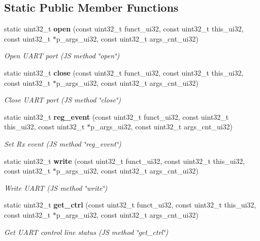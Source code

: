 \subsection*{Static Public Member Functions}
\begin{DoxyCompactItemize}
\item 
static uint32\+\_\+t \textbf{ open} (const uint32\+\_\+t funct\+\_\+ui32, const uint32\+\_\+t this\+\_\+ui32, const uint32\+\_\+t $\ast$p\+\_\+args\+\_\+ui32, const uint32\+\_\+t args\+\_\+cnt\+\_\+ui32)
\begin{DoxyCompactList}\small\item\em Open U\+A\+RT port (JS method \char`\"{}open\char`\"{}) \end{DoxyCompactList}\item 
static uint32\+\_\+t \textbf{ close} (const uint32\+\_\+t funct\+\_\+ui32, const uint32\+\_\+t this\+\_\+ui32, const uint32\+\_\+t $\ast$p\+\_\+args\+\_\+ui32, const uint32\+\_\+t args\+\_\+cnt\+\_\+ui32)
\begin{DoxyCompactList}\small\item\em Close U\+A\+RT port (JS method \char`\"{}close\char`\"{}) \end{DoxyCompactList}\item 
static uint32\+\_\+t \textbf{ reg\+\_\+event} (const uint32\+\_\+t funct\+\_\+ui32, const uint32\+\_\+t this\+\_\+ui32, const uint32\+\_\+t $\ast$p\+\_\+args\+\_\+ui32, const uint32\+\_\+t args\+\_\+cnt\+\_\+ui32)
\begin{DoxyCompactList}\small\item\em Set Rx event (JS method \char`\"{}reg\+\_\+event\char`\"{}) \end{DoxyCompactList}\item 
static uint32\+\_\+t \textbf{ write} (const uint32\+\_\+t funct\+\_\+ui32, const uint32\+\_\+t this\+\_\+ui32, const uint32\+\_\+t $\ast$p\+\_\+args\+\_\+ui32, const uint32\+\_\+t args\+\_\+cnt\+\_\+ui32)
\begin{DoxyCompactList}\small\item\em Write U\+A\+RT (JS method \char`\"{}write\char`\"{}) \end{DoxyCompactList}\item 
static uint32\+\_\+t \textbf{ get\+\_\+ctrl} (const uint32\+\_\+t funct\+\_\+ui32, const uint32\+\_\+t this\+\_\+ui32, const uint32\+\_\+t $\ast$p\+\_\+args\+\_\+ui32, const uint32\+\_\+t args\+\_\+cnt\+\_\+ui32)
\begin{DoxyCompactList}\small\item\em Get U\+A\+RT control line status (JS method \char`\"{}get\+\_\+ctrl\char`\"{}) \end{DoxyCompactList}\item 

\end{DoxyCompactItemize}
